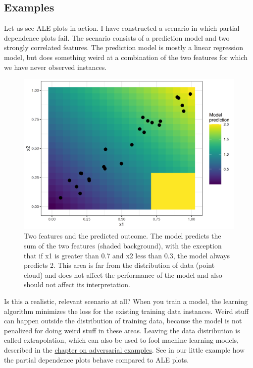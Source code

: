 \documentclass[12pt,]{krantz}
\begin{document}
\subsection{Examples}\label{examples-1}

Let us see ALE plots in action. I have constructed a scenario in which
partial dependence plots fail. The scenario consists of a prediction
model and two strongly correlated features. The prediction model is
mostly a linear regression model, but does something weird at a
combination of the two features for which we have never observed
instances.

\begin{figure}

{\centering \includegraphics[width=\textwidth]{images/correlation-problem-1} 

}

\caption{Two features and the predicted outcome. The model predicts the sum of the two features (shaded background), with the exception that if x1 is greater than 0.7 and x2 less than 0.3, the model always predicts 2. This area is far from the distribution of data (point cloud) and does not affect the performance of the model and also should not affect its interpretation.}\label{fig:correlation-problem}
\end{figure}

Is this a realistic, relevant scenario at all? When you train a model,
the learning algorithm minimizes the loss for the existing training data
instances. Weird stuff can happen outside the distribution of training
data, because the model is not penalized for doing weird stuff in these
areas. Leaving the data distribution is called extrapolation, which can
also be used to fool machine learning models, described in the
\protect\hyperlink{adversarial}{chapter on adversarial examples}. See in
our little example how the partial dependence plots behave compared to
ALE plots.
\end{document}
